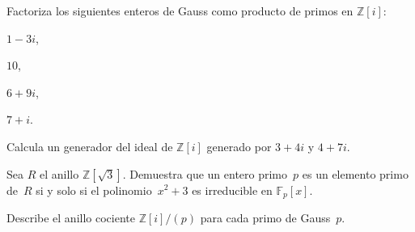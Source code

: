 \documentclass[12pt]{article}
\begin{document}

    
    
    
    
    
    
    
    
    \begin{exercise}[12.5.1]
        Factoriza los siguientes enteros de Gauss como producto de primos en $\mathbb{Z}[i]$: 
        \begin{inparaenum}[\bfseries(a)]
            \item $1-3i$,
            \item $10$,
            \item $6+9i$,
            \item $7+i$.
        \end{inparaenum}
    \end{exercise}
    
    \begin{exercise}[12.5.3]
        Calcula un generador del ideal de $\mathbb{Z}[i]$ generado por $3+4i$ y $4+7i$.
    \end{exercise}
    
    \begin{exercise}[12.5.6]
        Sea $R$ el anillo $\mathbb{Z}[\sqrt{3}]$. Demuestra que un entero primo~$p$ es un elemento primo de~$R$ si y solo si el polinomio~$x^{2}+3$ es irreducible en $\mathbb{F}_{p}[x]$.
    \end{exercise}
    
    \begin{exercise}[12.5.7]
        Describe el anillo cociente $\mathbb{Z}[i]/(p)$ para cada primo de Gauss~$p$.
    \end{exercise}
    
\end{document}
